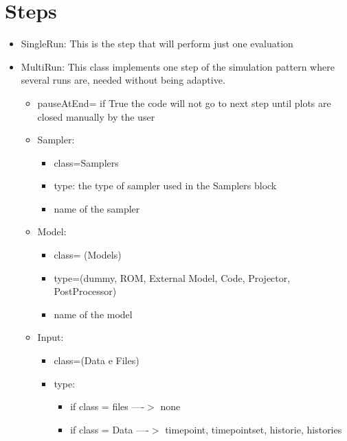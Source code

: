 \section{Steps  \\ \vspace{2 mm} {\small }}


\begin{itemize}
\item SingleRun: This is the step that will perform just one evaluation
\item MultiRun: This class implements one step of the simulation pattern where several runs are, needed without being adaptive.  
\begin{itemize}
	\begin{itemize}
	\item name = name of the step (sequence) defined in the RunInfo block, under the Sequence card
	\end{itemize}
\item pauseAtEnd= if True the code will not go to next step until plots are closed manually by the user
\end{itemize}
\begin{itemize}
\item Sampler: 
\begin {itemize}
\item class=Samplers 
\item type: the type of sampler used in the Samplers block 
\item name of the sampler
\end{itemize}
\item Model: 
\begin{itemize}
\item class= (Models) 
\item type=(dummy, ROM, External Model, Code, Projector, PostProcessor) 
\item name of the model
\end{itemize}
\item Input:  
\begin{itemize}
\item class=(Data e Files)
\item type:
\begin{itemize}
\item if class = files ----$>$ none
\item if class = Data  ----$>$ timepoint, timepointset, historie, histories
\end{itemize}

\end{itemize}
\end{itemize}
\end{itemize}
